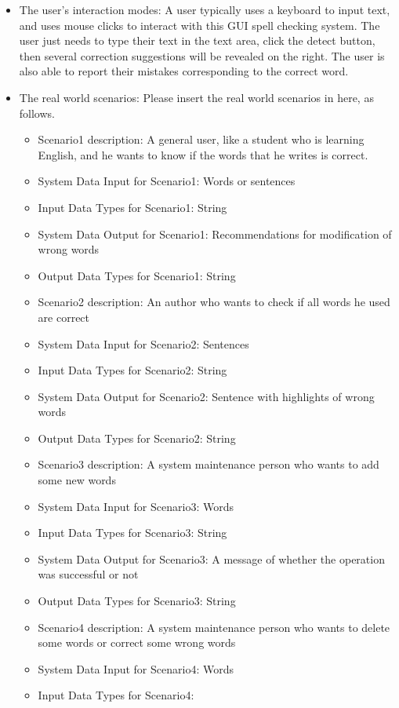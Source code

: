 \begin{itemize}
\item{The user's interaction modes: }
A user typically uses a keyboard to input text, and uses mouse clicks to interact with this GUI spell checking system. The user just needs to type their text in the text area, click the detect button, then several correction suggestions will be revealed on the right. The user is also able to report their mistakes corresponding to the correct word.
\item{The real world scenarios: }
Please insert the real world scenarios in here, as follows. 
	\begin{itemize} 
	\item{Scenario1 description: }
	A general user, like a student who is learning English, and he wants to know if the words that he writes is correct.
	\item{System Data Input for Scenario1: }
	Words or sentences
	\item{Input Data Types for Scenario1: }
	String
	\item{System Data Output for Scenario1: }
	Recommendations for modification of wrong words
	\item{Output Data Types for Scenario1: }
	String
	\item{Scenario2 description: }
	An author who wants to check if all words he used are correct 
	\item{System Data Input for Scenario2: }
	Sentences 
	\item{Input Data Types for Scenario2: }
	String
	\item{System Data Output for Scenario2: }
	Sentence with highlights of wrong words
	\item{Output Data Types for Scenario2: }
	String
	\item{Scenario3 description: }
	A system maintenance person who wants to add some new words
	\item{System Data Input for Scenario3: }
	Words  
	\item{Input Data Types for Scenario3: }
	String
	\item{System Data Output for Scenario3: }
	A message of whether the operation was successful or not
	\item{Output Data Types for Scenario3: }
	String
	\item{Scenario4 description: }
	A system maintenance person who wants to delete some words or correct some wrong words
	\item{System Data Input for Scenario4: }
	Words  
	\item{Input Data Types for Scenario4: }

\end{itemize}
\end{itemize}
